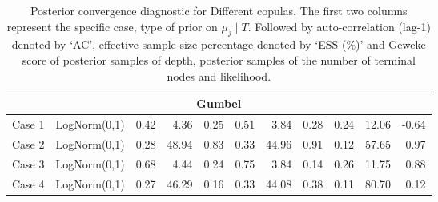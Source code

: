 \documentclass{amsart}
\begin{document}
\begin{table}[ht]
{\begin{tabular}{ll|crr|crr|crr}
			\midrule
			\multicolumn{11}{c}{Gumbel} \\
			\midrule
			Case 1 & LogNorm(0,1) & 0.42 & 4.36 & 0.25 & 0.51 & 3.84 & 0.28 & 0.24 & 12.06 & -0.64 \\ 
			Case 2 & LogNorm(0,1) & 0.28 & 48.94 & 0.83 & 0.33 & 44.96 & 0.91 & 0.12 & 57.65 & 0.97 \\ 
			Case 3 & LogNorm(0,1) & 0.68 & 4.44 & 0.24 & 0.75 & 3.84 & 0.14 & 0.26 & 11.75 & 0.88 \\ 
			Case 4 & LogNorm(0,1) & 0.27 & 46.29 & 0.16 & 0.33 & 44.08 & 0.38 & 0.11 & 80.70 & 0.12 \\ 
			\bottomrule
	\end{tabular}
\caption{Posterior convergence diagnostic for Different copulas. The first two columns represent the specific case, type of prior on $\mu_j\mid T$. Followed by auto-correlation (lag-1) denoted by `AC', effective sample size percentage denoted by `ESS (\%)' and Geweke score of posterior samples of depth, posterior samples of the number of terminal nodes and likelihood.}}
\label{tab:gauss:convergence}
\end{table}




\end{document}
